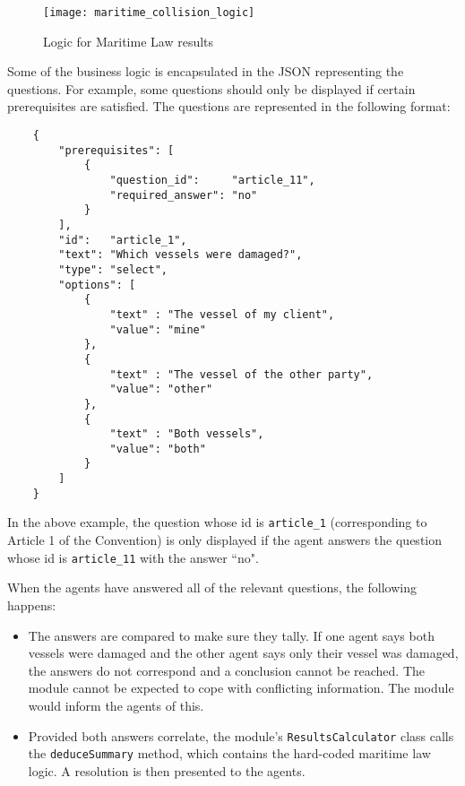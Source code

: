 \begin{figure}[h!]
  \centering
    \ifimages
    \texttt{[image: maritime\_collision\_logic]}
    \fi
  \caption{Logic for Maritime Law results}
  \label{uml:maritimeLogic}
\end{figure}

Some of the business logic is encapsulated in the JSON representing the questions. For example, some questions should only be displayed if certain prerequisites are satisfied. The questions are represented in the following format:

\begin{minipage}{\textwidth}
\begin{lstlisting}
    {
        "prerequisites": [
            {
                "question_id":     "article_11",
                "required_answer": "no"
            }
        ],
        "id":   "article_1",
        "text": "Which vessels were damaged?",
        "type": "select",
        "options": [
            {
                "text" : "The vessel of my client",
                "value": "mine"
            },
            {
                "text" : "The vessel of the other party",
                "value": "other"
            },
            {
                "text" : "Both vessels",
                "value": "both"
            }
        ]
    }
\end{lstlisting}
\end{minipage}

In the above example, the question whose id is \lstinline{article_1} (corresponding to Article 1 of the Convention) is only displayed if the agent answers the question whose id is \lstinline{article_11} with the answer ``no".

When the agents have answered all of the relevant questions, the following happens:

\begin{itemize}
    \item The answers are compared to make sure they tally. If one agent says both vessels were damaged and the other agent says only their vessel was damaged, the answers do not correspond and a conclusion cannot be reached. The module cannot be expected to cope with conflicting information. The module would inform the agents of this.
    \item Provided both answers correlate, the module's \lstinline{ResultsCalculator} class calls the \lstinline{deduceSummary} method, which contains the hard-coded maritime law logic. A resolution is then presented to the agents.
\end{itemize}

